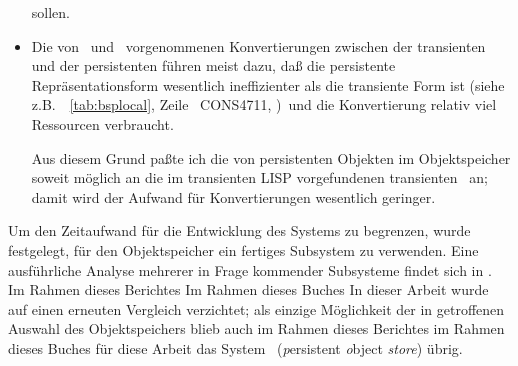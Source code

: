 \begin{itemize}
sollen.
%
\item Die von \soh\ und \pclos\ vorgenommenen Konvertierungen zwischen
der transienten und der persistenten \representationform{} f\"{u}hren
meist dazu, da\ss{} die persistente Re\-pr\"{a}\-sen\-ta\-tions\-form
wesentlich ineffizienter als die transiente Form ist
\ifbericht\else(siehe z.B.\ \tablename~\ref{tab:bsplocal}, Zeile
\ CONS4711,
\citepage{\pageref{tab:bsplocal}})\fi\ und die Konvertierung relativ
viel Ressourcen verbraucht.
%
\par{}Aus diesem Grund pa\ss{}te ich die \representationform{} von
persistenten Objekten im Objektspeicher soweit m\"{o}glich an die im
transienten  LISP vorgefundenen transienten \representationforms\ an;
damit wird der Aufwand f\"{u}r Konvertierungen wesentlich geringer.
%
\end{itemize}
%
Um den Zeitaufwand f\"{u}r die Entwicklung des Systems zu begrenzen,
wurde festgelegt, f\"{u}r den Objektspeicher ein fertiges Subsystem zu
verwenden. Eine ausf\"{u}hrliche Analyse mehrerer in Frage kommender
Subsysteme findet sich in \cite[]{bib:mu91}.
\ifbericht Im Rahmen dieses Berichtes \else\ifbuch Im Rahmen dieses
Buches \else In dieser Arbeit \fi\fi wurde auf einen erneuten
Vergleich verzichtet; als einzige M\"{o}glichkeit der in
\cite[]{bib:mu91} getroffenen Auswahl des
Objektspeichers blieb auch \ifbericht im Rahmen dieses Berichtes
\else\ifbuch im Rahmen dieses Buches \else f\"{u}r diese Arbeit \fi\fi
das System \postore\ ({\em p\/}ersistent {\em o\/}bject {\em store\/})
\"{u}brig.
%
